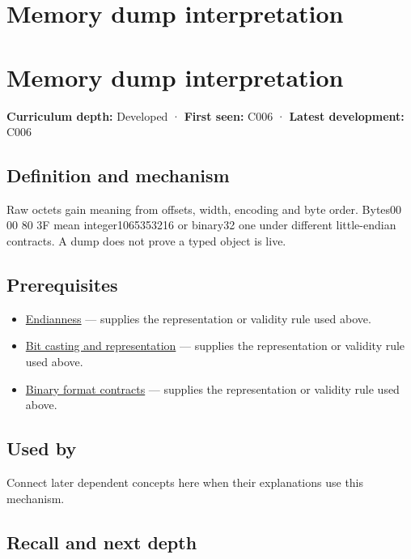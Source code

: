 \hypertarget{appendix-230b59c0676b}{}
\section*{Memory dump interpretation}
\section{Memory dump interpretation}\label{memory-dump-interpretation}

\textbf{Curriculum depth:} Developed · \textbf{First seen:} C006 · \textbf{Latest development:} C006

\subsection{Definition and mechanism}\label{definition-and-mechanism}

Raw octets gain meaning from offsets, width, encoding and byte order. Bytes00 00 80 3F mean integer1065353216 or binary32 one under different little-endian contracts. A dump does not prove a typed object is live.

\subsection{Prerequisites}\label{prerequisites}

\begin{itemize}
\tightlist
\item
  \hyperref[appendix-bc07c3d25b18]{Endianness} --- supplies the representation or validity rule used above.
\item
  \hyperref[appendix-34ee45f161c1]{Bit casting and representation} --- supplies the representation or validity rule used above.
\item
  \hyperref[appendix-590bbb2424c1]{Binary format contracts} --- supplies the representation or validity rule used above.
\end{itemize}

\subsection{Used by}\label{used-by}

Connect later dependent concepts here when their explanations use this mechanism.

\subsection{Recall and next depth}\label{recall-and-next-depth}

